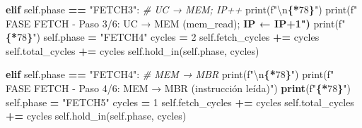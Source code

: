 \documentclass[12pt,oneside]{templates/unerthesis}
\newenvironment{Shaded}{\begin{snugshade}}{\end{snugshade}}
\newcommand{\BuiltInTok}[1]{#1}
\newcommand{\CharTok}[1]{\textcolor[rgb]{0.31,0.60,0.02}{#1}}
\newcommand{\CommentTok}[1]{\textcolor[rgb]{0.56,0.35,0.01}{\textit{#1}}}
\newcommand{\ControlFlowTok}[1]{\textcolor[rgb]{0.13,0.29,0.53}{\textbf{#1}}}
\newcommand{\DecValTok}[1]{\textcolor[rgb]{0.00,0.00,0.81}{#1}}
\newcommand{\ErrorTok}[1]{\textcolor[rgb]{0.64,0.00,0.00}{\textbf{#1}}}
\newcommand{\NormalTok}[1]{#1}
\newcommand{\OperatorTok}[1]{\textcolor[rgb]{0.81,0.36,0.00}{\textbf{#1}}}
\newcommand{\SpecialCharTok}[1]{\textcolor[rgb]{0.81,0.36,0.00}{\textbf{#1}}}
\newcommand{\SpecialStringTok}[1]{\textcolor[rgb]{0.31,0.60,0.02}{#1}}
\newcommand{\StringTok}[1]{\textcolor[rgb]{0.31,0.60,0.02}{#1}}
\newcommand{\VariableTok}[1]{\textcolor[rgb]{0.00,0.00,0.00}{#1}}
\begin{document}
\begin{Shaded}
\begin{Highlighting}[]
        \ControlFlowTok{elif} \VariableTok{self}\NormalTok{.phase }\OperatorTok{==} \StringTok{"FETCH3"}\NormalTok{:  }\CommentTok{\# UC → MEM; IP++}
            \BuiltInTok{print}\NormalTok{(}\SpecialStringTok{f"}\CharTok{\textbackslash{}n}\SpecialCharTok{\{}\StringTok{\textquotesingle{}{-}\textquotesingle{}}\OperatorTok{*}\DecValTok{78}\SpecialCharTok{\}}\SpecialStringTok{"}\NormalTok{)}
            \BuiltInTok{print}\NormalTok{(}\SpecialStringTok{f"  FASE FETCH {-} Paso 3/6: UC → MEM (mem\_read);}
\ErrorTok{            IP ← IP+1")}
            \BuiltInTok{print}\NormalTok{(}\SpecialStringTok{f"}\SpecialCharTok{\{}\StringTok{\textquotesingle{}{-}\textquotesingle{}}\OperatorTok{*}\DecValTok{78}\SpecialCharTok{\}}\SpecialStringTok{"}\NormalTok{)}
            \VariableTok{self}\NormalTok{.phase }\OperatorTok{=} \StringTok{"FETCH4"}
\NormalTok{            cycles }\OperatorTok{=} \DecValTok{2}
            \VariableTok{self}\NormalTok{.fetch\_cycles }\OperatorTok{+=}\NormalTok{ cycles}
            \VariableTok{self}\NormalTok{.total\_cycles }\OperatorTok{+=}\NormalTok{ cycles}
            \VariableTok{self}\NormalTok{.hold\_in(}\VariableTok{self}\NormalTok{.phase, cycles)}
        
        \ControlFlowTok{elif} \VariableTok{self}\NormalTok{.phase }\OperatorTok{==} \StringTok{"FETCH4"}\NormalTok{:  }\CommentTok{\# MEM → MBR}
            \BuiltInTok{print}\NormalTok{(}\SpecialStringTok{f"}\CharTok{\textbackslash{}n}\SpecialCharTok{\{}\StringTok{\textquotesingle{}{-}\textquotesingle{}}\OperatorTok{*}\DecValTok{78}\SpecialCharTok{\}}\SpecialStringTok{"}\NormalTok{)}
            \BuiltInTok{print}\NormalTok{(}\SpecialStringTok{f"  FASE FETCH {-} Paso 4/6: MEM → MBR }
\ErrorTok{            }\NormalTok{(instrucción leída)}\StringTok{")}
\ErrorTok{            print}\NormalTok{(}\SpecialStringTok{f"}\SpecialCharTok{\{}\StringTok{\textquotesingle{}{-}\textquotesingle{}}\OperatorTok{*}\DecValTok{78}\SpecialCharTok{\}}\SpecialStringTok{"}\NormalTok{)}
            \VariableTok{self}\NormalTok{.phase }\OperatorTok{=} \StringTok{"FETCH5"}
\NormalTok{            cycles }\OperatorTok{=} \DecValTok{1}
            \VariableTok{self}\NormalTok{.fetch\_cycles }\OperatorTok{+=}\NormalTok{ cycles}
            \VariableTok{self}\NormalTok{.total\_cycles }\OperatorTok{+=}\NormalTok{ cycles}
            \VariableTok{self}\NormalTok{.hold\_in(}\VariableTok{self}\NormalTok{.phase, cycles)}
        

\end{Highlighting}
\end{Shaded}
\end{document}
